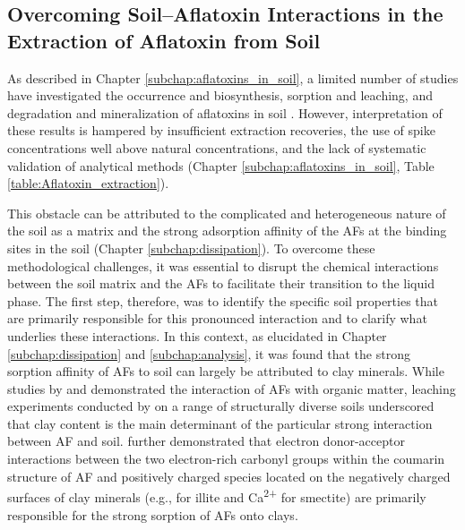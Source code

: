 \subsection{Overcoming Soil--Aflatoxin Interactions in the Extraction of Aflatoxin from Soil} 

As described in Chapter \ref{subchap:aflatoxins_in_soil}, a limited number of studies have investigated the occurrence and biosynthesis, sorption and leaching, and degradation and mineralization of aflatoxins in soil \citep{accinelli2008aspergillus, goldberg1985aflatoxin, angle1980decomposition, angle1986aflatoxin}. However, interpretation of these results is hampered by insufficient extraction recoveries, the use of spike concentrations well above natural concentrations, and the lack of systematic validation of analytical methods (Chapter \ref{subchap:aflatoxins_in_soil}, Table \ref{table:Aflatoxin_extraction}). 


This obstacle can be attributed to the complicated and heterogeneous nature of the soil as a matrix and the strong adsorption affinity of the AFs at the binding sites in the soil (Chapter \ref{subchap:dissipation}). To overcome these methodological challenges, it was essential to disrupt the chemical interactions between the soil matrix and the AFs to facilitate their transition to the liquid phase. The first step, therefore, was to identify the specific soil properties that are primarily responsible for this pronounced interaction and to clarify what underlies these interactions. In this context, as elucidated in Chapter \ref{subchap:dissipation} and \ref{subchap:analysis}, it was found that the strong sorption affinity of AFs to soil can largely be attributed to clay minerals.  While studies by \citet{schenzel2012experimentally} and \citet{van2006vitro} demonstrated the interaction of AFs with organic matter, leaching experiments conducted by \citet{goldberg1985aflatoxin} on a range of structurally diverse soils underscored that clay content is the main determinant of the particular strong interaction between AF and soil. \citet{kang2016understanding} further demonstrated that electron donor-acceptor interactions between the two electron-rich carbonyl groups within the coumarin structure of AF and positively charged species located on the negatively charged surfaces of clay minerals (e.g.,  for illite and Ca\textsuperscript{2+} for smectite) are primarily responsible for the strong sorption of AFs onto clays. 

